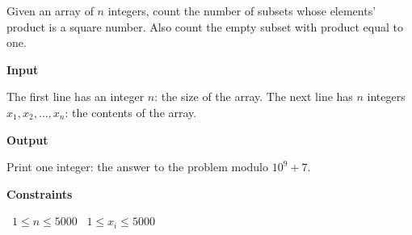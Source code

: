 Given an array of $n$ integers, count the number of subsets whose elements' product is a square number.
Also count the empty subset with product equal to one.

\vspace{0.3cm}\noindent\textbf{Input}

The first line has an integer $n$: the size of the array.
The next line has $n$ integers $x_1, x_2,\dots, x_n$: the contents of the array.

\vspace{0.3cm}\noindent\textbf{Output}

Print one integer: the answer to the problem modulo $10^9 + 7$.

\vspace{0.3cm}\noindent\textbf{Constraints}

\textbullet\ $1 \le n \le 5000$
\textbullet\ $1 \le x_i \le 5000$